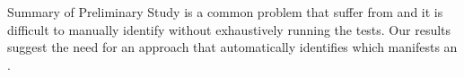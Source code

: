 \begin{Summary}{Summary of Preliminary Study}{}
\inconsistent is a common problem that \instance suffer from and it is difficult to manually identify \inconsistent without exhaustively running the tests. Our results suggest the need for an approach that automatically identifies which \instance manifests an \inconsistent. 
\end{Summary}